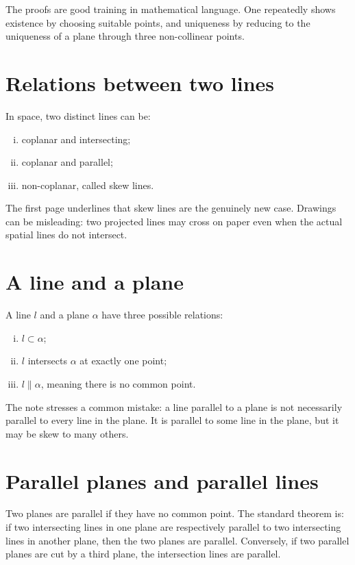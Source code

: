 The proofs are good training in mathematical language.  One repeatedly shows existence by choosing suitable points, and uniqueness by reducing to the uniqueness of a plane through three non-collinear points.

\section{Relations between two lines}

In space, two distinct lines can be:
\begin{enumerate}[(i)]
  \item coplanar and intersecting;
  \item coplanar and parallel;
  \item non-coplanar, called skew lines.

\end{enumerate}
The first page underlines that skew lines are the genuinely new case.  Drawings can be misleading: two projected lines may cross on paper even when the actual spatial lines do not intersect.

\section{A line and a plane}

A line \(l\) and a plane \(\alpha\) have three possible relations:
\begin{enumerate}[(i)]
  \item \(l\subset\alpha\);
  \item \(l\) intersects \(\alpha\) at exactly one point;
  \item \(l\parallel\alpha\), meaning there is no common point.

\end{enumerate}

The note stresses a common mistake: a line parallel to a plane is not necessarily parallel to every line in the plane.  It is parallel to some line in the plane, but it may be skew to many others.

\section{Parallel planes and parallel lines}

Two planes are parallel if they have no common point.  The standard theorem is: if two intersecting lines in one plane are respectively parallel to two intersecting lines in another plane, then the two planes are parallel.  Conversely, if two parallel planes are cut by a third plane, the intersection lines are parallel.

